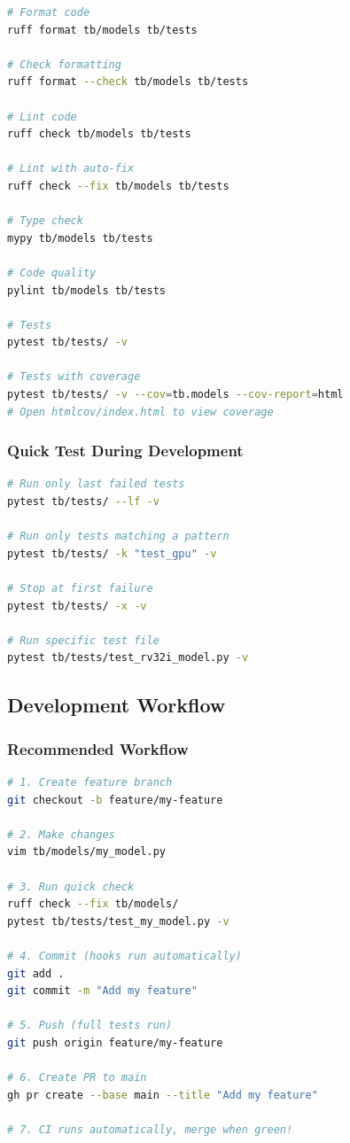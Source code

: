 \begin{lstlisting}[language=bash]
# Format code
ruff format tb/models tb/tests

# Check formatting
ruff format --check tb/models tb/tests

# Lint code
ruff check tb/models tb/tests

# Lint with auto-fix
ruff check --fix tb/models tb/tests

# Type check
mypy tb/models tb/tests

# Code quality
pylint tb/models tb/tests

# Tests
pytest tb/tests/ -v

# Tests with coverage
pytest tb/tests/ -v --cov=tb.models --cov-report=html
# Open htmlcov/index.html to view coverage
\end{lstlisting}

\subsubsection{Quick Test During Development}\label{um:guide:local-qa:quick-test-during-development}

\begin{lstlisting}[language=bash]
# Run only last failed tests
pytest tb/tests/ --lf -v

# Run only tests matching a pattern
pytest tb/tests/ -k "test_gpu" -v

# Stop at first failure
pytest tb/tests/ -x -v

# Run specific test file
pytest tb/tests/test_rv32i_model.py -v
\end{lstlisting}

\subsection{Development Workflow}\label{um:guide:local-qa:development-workflow}

\subsubsection{Recommended Workflow}\label{um:guide:local-qa:recommended-workflow}

\begin{lstlisting}[language=bash]
# 1. Create feature branch
git checkout -b feature/my-feature

# 2. Make changes
vim tb/models/my_model.py

# 3. Run quick check
ruff check --fix tb/models/
pytest tb/tests/test_my_model.py -v

# 4. Commit (hooks run automatically)
git add .
git commit -m "Add my feature"

# 5. Push (full tests run)
git push origin feature/my-feature

# 6. Create PR to main
gh pr create --base main --title "Add my feature"

# 7. CI runs automatically, merge when green!
\end{lstlisting}

